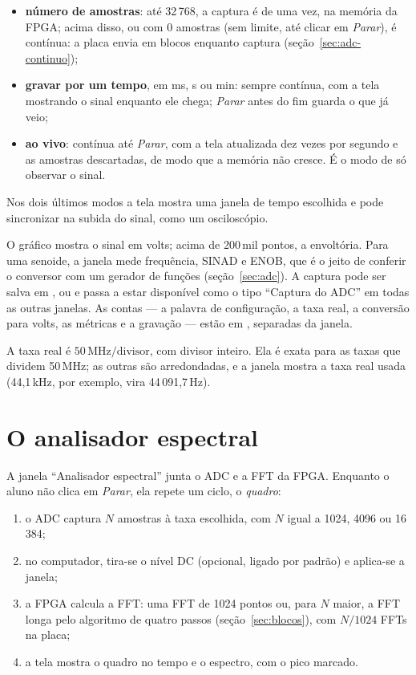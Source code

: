 \begin{itemize}
  \item \textbf{número de amostras}: até 32\,768, a captura é de uma vez, na
    memória da FPGA; acima disso, ou com 0 amostras (sem limite, até clicar em
    \emph{Parar}), é contínua: a placa envia em blocos enquanto captura
    (seção~\ref{sec:adc-continuo});
  \item \textbf{gravar por um tempo}, em ms, s ou min: sempre contínua, com a
    tela mostrando o sinal enquanto ele chega; \emph{Parar} antes do fim guarda
    o que já veio;
  \item \textbf{ao vivo}: contínua até \emph{Parar}, com a tela atualizada dez
    vezes por segundo e as amostras descartadas, de modo que a memória não
    cresce. É o modo de só observar o sinal.
\end{itemize}

Nos dois últimos modos a tela mostra uma janela de tempo escolhida e pode
sincronizar na subida do sinal, como um osciloscópio.

O gráfico mostra o sinal em volts; acima de 200\,mil pontos, a envoltória. Para
uma senoide, a janela mede frequência, SINAD e ENOB, que é o jeito de conferir o
conversor com um gerador de funções (seção~\ref{sec:adc}). A captura pode ser
salva em ,  ou  e passa a estar disponível como o
tipo ``Captura do ADC'' em todas as outras janelas. As contas --- a palavra de
configuração, a taxa real, a conversão para volts, as métricas e a gravação ---
estão em , separadas da janela.

A taxa real é \(50\,\text{MHz}/\text{divisor}\), com divisor inteiro. Ela é
exata para as taxas que dividem 50\,MHz; as outras são arredondadas, e a janela
mostra a taxa real usada (44,1\,kHz, por exemplo, vira 44\,091,7\,Hz).

\section{O analisador espectral}
\label{sec:analisador}

A janela ``Analisador espectral'' junta o ADC e a FFT da FPGA. Enquanto o aluno
não clica em \emph{Parar}, ela repete um ciclo, o \emph{quadro}:

\begin{enumerate}
  \item o ADC captura \(N\) amostras à taxa escolhida, com \(N\) igual a 1024,
    4096 ou 16\,384;
  \item no computador, tira-se o nível DC (opcional, ligado por padrão) e
    aplica-se a janela;
  \item a FPGA calcula a FFT: uma FFT de 1024 pontos ou, para \(N\) maior, a
    FFT longa pelo algoritmo de quatro passos (seção~\ref{sec:blocos}), com
    \(N/1024\) FFTs na placa;
  \item a tela mostra o quadro no tempo e o espectro, com o pico marcado.
\end{enumerate}

